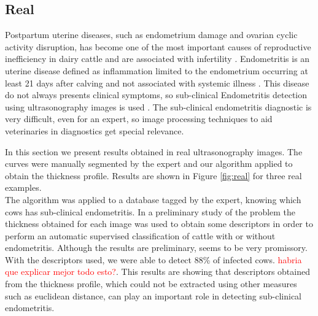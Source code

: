 \documentclass{article}
\begin{document}
\subsection{Real}
\label{ssec:real}
Postpartum uterine diseases, such as endometrium damage and ovarian cyclic activity disruption, has become one of the most important causes of reproductive inefficiency in dairy cattle and are associated with infertility \cite{sheldon2008,barlund2008}. Endometritis is an uterine disease defined as inflammation limited to the endometrium occurring at least 21 days after calving and not associated with systemic illness \cite{sheldon2010}. This disease do not always presents clinical symptoms, so sub-clinical Endometritis detection using ultrasonography images is used \cite{Gianni2010, Gianni2013}. The sub-clinical endometritis diagnostic is very difficult, even for an expert, so image processing techniques to aid veterinaries in diagnostics get special relevance.

In this section we present results obtained in real ultrasonography images. The curves were manually segmented by the expert and our algorithm applied to obtain the thickness profile. Results are shown in Figure \ref{fig:real} for three real examples.\\

The algorithm was applied to a database tagged by the expert, knowing which cows has sub-clinical endometritis. In a preliminary study of the problem the thickness obtained for each image was used to obtain some descriptors in order to perform an automatic supervised classification of cattle with or without endometritis. Although the results are preliminary, seems to be very promissory. With the descriptors used, we were able to detect 88\% of infected cows. \textcolor{red}{habria que explicar mejor todo esto?}. This results are showing that descriptors obtained from the thickness profile, which could not be extracted using other measures such as euclidean distance, can play an important role in detecting sub-clinical endometritis.
\end{document}
